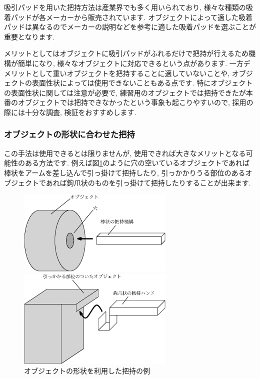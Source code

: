 吸引パッドを用いた把持方法は産業界でも多く用いられており, 様々な種類の吸着パッドが各メーカーから販売されています. オブジェクトによって適した吸着パッドは異なるのでメーカーの説明などを参考に適した吸着パッドを選ぶことが重要となります. 

メリットとしてはオブジェクトに吸引パッドがふれるだけで把持が行えるため機構が簡単になり, 様々なオブジェクトに対応できるという点があります. 
一方デメリットとして重いオブジェクトを把持することに適していないことや, オブジェクトの表面性状によっては使用できないこともある点です. 特にオブジェクトの表面性状に関しては注意が必要で, 練習用のオブジェクトでは把持できたが本番のオブジェクトでは把持できなかったという事象も起こりやすいので, 採用の際には十分な調査, 検証をおすすめします. 
\subsubsection{オブジェクトの形状に合わせた把持}
この手法は使用できるとは限りませんが, 使用できれば大きなメリットとなる可能性のある方法です. 
例えば図\ref{fig:advance}のように穴の空いているオブジェクトであれば棒状をアームを差し込んで引っ掛けて把持したり, 引っかかりうる部位のあるオブジェクトであれば鉤爪状のものを引っ掛けて把持したりすることが出来ます. 

\begin{figure}[h]
 \begin{minipage}{0.5\hsize}
  \begin{center}
   \includegraphics[width=75mm]{mecha/fig/hole.eps}
  \end{center}
 \end{minipage}
 \begin{minipage}{0.5\hsize}
  \begin{center}
   \includegraphics[width=75mm]{mecha/fig/kagi.eps}
  \end{center}
 \end{minipage}
 \caption{オブジェクトの形状を利用した把持の例}
 \label{fig:advance}
\end{figure}

